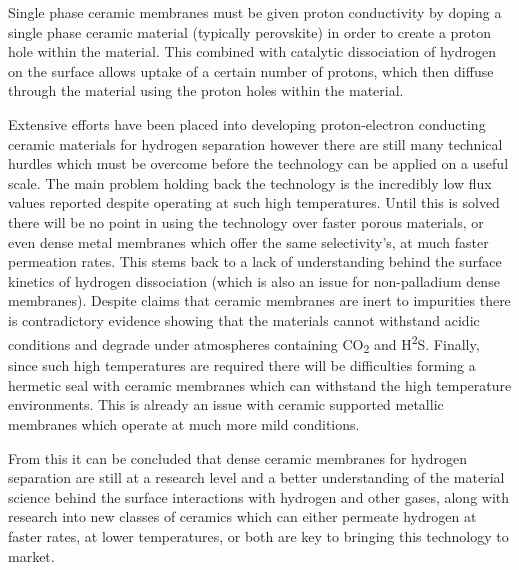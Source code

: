 Single phase ceramic membranes must be given proton conductivity by doping a single phase 
ceramic material (typically perovskite) in order to create a proton hole within the material. 
This combined with catalytic dissociation of hydrogen  on the surface allows uptake of a 
certain number of protons, which then diffuse through the material using the proton holes 
within the material. \cite{Tao2015, Phair2006}

Extensive efforts have been placed into developing proton-electron conducting ceramic 
materials for hydrogen separation however there are still many technical hurdles which must 
be overcome before the technology can be applied on a useful scale. The main problem holding 
back the technology is the incredibly low flux values reported despite operating at such high 
temperatures. Until this is solved there will be no point in using the technology over 
faster porous materials, or even dense metal membranes which offer the same selectivity’s, 
at much faster permeation rates. This stems back to a lack of understanding behind the 
surface kinetics of hydrogen dissociation (which is also an issue for non-palladium dense 
membranes). Despite claims that ceramic membranes are inert to impurities there is 
contradictory evidence showing that the materials cannot withstand acidic conditions and 
degrade under atmospheres containing CO\textsubscript{2} and H\textsuperscript{2}S. 
Finally, since such high temperatures are 
required there will be difficulties forming a hermetic seal with ceramic membranes which can 
withstand the high temperature environments. This is already an issue with ceramic supported 
metallic membranes which operate at much more mild conditions. 

From this it can be concluded that dense ceramic membranes for hydrogen separation are still 
at a research level and a better understanding of the material science behind the surface 
interactions with hydrogen and other gases, along with research into new classes of ceramics 
which can either permeate hydrogen at faster rates, at lower temperatures, or both are key 
to bringing this technology to market. 


\eject \pdfpagewidth=16.5in \pdfpageheight=11.7in


